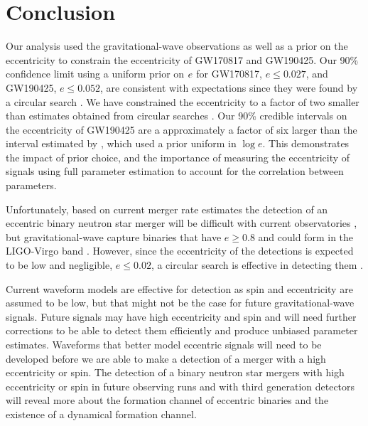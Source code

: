 \section{Conclusion}
Our analysis used the gravitational-wave observations as well as a prior on the eccentricity to constrain the eccentricity of GW170817 and GW190425. Our 90\% confidence limit using a uniform prior on $e$ for GW170817, $e \leq 0.027$, and GW190425, $e \leq 0.052$, are consistent with expectations since they were found by a circular search \cite{Peters:1964zz}. We have constrained the eccentricity to a factor of two smaller than estimates obtained from circular searches \cite{Brown:2009ng,Huerta:2013qb}. Our 90\% credible intervals on the eccentricity of GW190425 are a approximately a factor of six larger than the interval estimated by \cite{Romero-Shaw:2020aaj}, which used a prior uniform in $\log e$. This demonstrates the impact of prior choice, and the importance of measuring the eccentricity of signals using full parameter estimation to account for the correlation between parameters.

Unfortunately, based on current merger rate estimates the detection of an eccentric binary neutron star merger will be difficult with current observatories \cite{Lee:2009ca,Ye:2019xvf,Nitz:2019spj}, but gravitational-wave capture binaries that have $e \geq 0.8$ and could form in the LIGO-Virgo band \cite{Rodriguez:2018pss,Takatsy:2018euo}. However, since the eccentricity of the detections is expected to be low and negligible, $e \leq 0.02$, a circular search is effective in detecting them \cite{Brown:2009ng,Huerta:2013qb}. 

Current waveform models are effective for detection as spin and eccentricity are assumed to be low, but that might not be the case for future gravitational-wave signals. Future signals may have high eccentricity and spin and will need further corrections to be able to detect them efficiently and produce unbiased parameter estimates. Waveforms that better model eccentric signals will need to be developed before we are able to make a detection of a merger with a high eccentricity or spin. The detection of a binary neutron star mergers with high eccentricity or spin in future observing runs and with third generation detectors will reveal more about the formation channel of eccentric binaries and the existence of a dynamical formation channel. 

